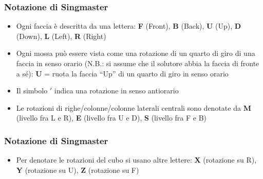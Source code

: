 \documentclass{beamer}
\begin{document}
\begin{frame}
\frametitle{Notazione di Singmaster}
\begin{itemize}
\item Ogni faccia è descritta da una lettera: \textbf{F} (Front), \textbf{B}
(Back), \textbf{U} (Up), \textbf{D} (Down), \textbf{L} (Left), \textbf{R}
(Right)
\item Ogni mossa può essere vista come una rotazione di un quarto di giro di
una faccia in senso orario (N.B.: si assume che il solutore abbia la faccia di
fronte a sé): \textbf{U} = ruota la faccia ``Up'' di un quarto di giro in senso
orario
\item Il simbolo $'$ indica una rotazione in senso antiorario
\item Le rotazioni di righe/colonne/colonne laterali centrali sono denotate da
\textbf{M} (livello fra L e R), \textbf{E} (livello fra U e D), \textbf{S}
(livello fra F e B)
\end{itemize}
\end{frame}

\begin{frame}
\frametitle{Notazione di Singmaster}
\begin{itemize}
\item Per denotare le rotazioni del cubo si usano altre lettere: \textbf{X}
(rotazione su R), \textbf{Y} (rotazione su U), \textbf{Z} (rotazione su F)
\end{itemize}
\end{frame}
\end{document}
